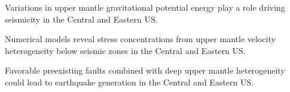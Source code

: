 \documentclass[draft,linenumbers]{agujournal2018}
\begin{document}



\begin{keypoints}
\item Variations in upper mantle gravitational potential energy play a role driving seismicity in the Central and Eastern US.
\item Numerical models reveal stress concentrations from upper mantle velocity heterogeneity below seismic zones in the Central and Eastern US.
\item Favorable preexisting faults combined with deep upper mantle  heterogeneity could lead to earthquake generation in the Central and Eastern US.
\end{keypoints}
\end{document}
